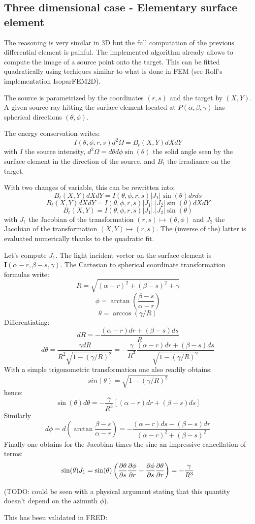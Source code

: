 \subsection{Three dimensional case - Elementary surface element }
The reasoning is very similar in 3D but the full computation
of the previous differential element is painful.
The implemented algorithm already allows to compute
the image of a source point onto the target.
This can be fitted quadratically using techiques similar to what
is done in FEM (see Rolf's implementation IsoparFEM2D).

The source is parametrized by the coordinates $(r, s)$ and
the target by $(X, Y)$. A given source ray hitting the surface
element located at $P(\alpha, \beta, \gamma)$ has spherical 
directions $(\theta, \phi)$.

The energy conservation writes:
\[ I(\theta, \phi, r, s)d^2\Omega = B_t(X, Y)dXdY\]
with $I$ the source intensity, $d^2\Omega = d\theta d\phi\sin(\theta)$
 the solid angle 
seen by the surface element in the direction of 
the source, and $B_t$ the irradiance
on the target.

With two changes of variable, this can be rewritten into:
\[ B_t(X, Y)dXdY = I(\theta, \phi, r, s)|J_1| 
\sin(\theta) dr ds  \]
\[ B_t(X, Y)dXdY = I(\theta, \phi, r, s)|J_1|. |J_2| \sin(\theta) dX dY\]
\[ B_t(X, Y) = I(\theta, \phi, r, s)|J_1|. |J_2| \sin(\theta)\]
with $J_1$ the Jacobian of the transformation 
$(r, s) \mapsto (\theta, \phi)$ and $J_2$ the Jacobian of the 
transformation $(X, Y) \mapsto (r, s)$. The (inverse of the) 
latter is evaluated
numerically thanks to the quadratic fit.

Let's compute $J_1$.
The light incident vector on the surface element is 
$\mathbf{I}(\alpha-r, \beta-s, \gamma)$.
 The Cartesian to spherical 
coordinate transformation formulas write:
\[ R = \sqrt{(\alpha-r)^2+(\beta-s)^2+\gamma} \]
\[ \phi = \arctan(\frac{\beta-s}{\alpha-r}) \]
\[ \theta = \arccos(\gamma/R) \]
Differentiating:
\[ dR = -\frac{(\alpha-r)dr + (\beta-s)ds}{R} \]
\[ d\theta = \frac{\gamma dR}{R^2 \sqrt{1-(\gamma/R)^2}} 
 = -\frac{\gamma}{R^3} \frac{(\alpha-r)dr + (\beta-s)ds}
{\sqrt{1-(\gamma/R)^2}} \]
With a simple trigonometric transformation one also readily
obtains:
\[ sin(\theta) = \sqrt{1-(\gamma/R)^2} \]
hence:
\[ \sin(\theta) d\theta = 
 -\frac{\gamma}{R^3} \left[ (\alpha-r)dr + (\beta-s)ds \right] \]
Similarly
\[ d\phi = d\left(\arctan\frac{\beta-s}{\alpha-r} \right) 
= - \frac{(\alpha-r)ds - (\beta-s)dr}{(\alpha-r)^2 + (\beta-s)^2}
\]
Finally one obtains for the Jacobian times the sine an 
impressive cancellation of terms:
\[ \sin(\theta) J_1 = \sin(\theta)\left( \frac{\partial{\theta}}{\partial{s}} 
\frac{\partial{\phi}}{\partial{r}} - \frac{\partial{\phi}}{\partial{s}}\frac{\partial{\theta}}{\partial{r}} \right) 
 = -\frac{\gamma}{R^3}\]

(TODO: could be seen with a physical argument stating that
this quantity doesn't depend on the azimuth $\phi$).

This has been validated in FRED:

